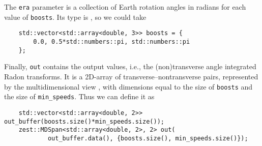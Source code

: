 \documentclass{article}
\begin{document}
The \texttt{era} parameter is a collection of Earth rotation angles in radians for each value of \texttt{boosts}. Its type is , so we could take
\begin{verbatim}
    std::vector<std::array<double, 3>> boosts = {
        0.0, 0.5*std::numbers::pi, std::numbers::pi
    };
\end{verbatim}

Finally, \texttt{out} contains the output values, i.e., the (non)transverse angle integrated Radon transforms. It is a 2D-array of transverse--nontransverse pairs, represented by the multidimensional view , with dimensions equal to the size of \texttt{boosts} and the size of \texttt{min\_speeds}. Thus we can define it as
\begin{verbatim}
    std::vector<std::array<double, 2>> out_buffer(boosts.size()*min_speeds.size());
    zest::MDSpan<std::array<double, 2>, 2> out(
            out_buffer.data(), {boosts.size(), min_speeds.size()});
\end{verbatim}
\end{document}
